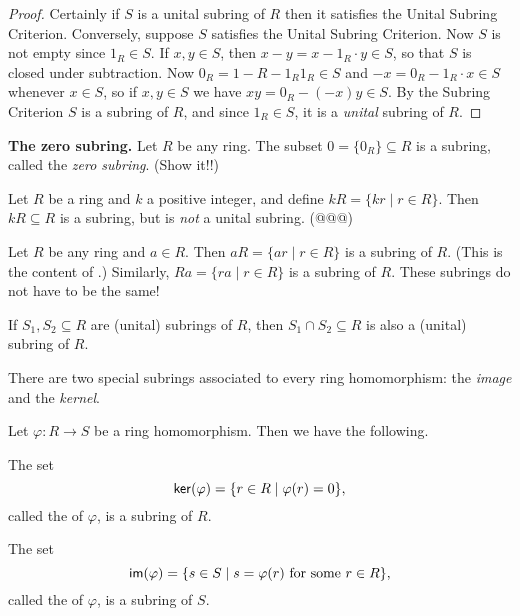 \begin{proof}
Certainly if \(S\) is a unital subring of \(R\) then it satisfies the Unital Subring Criterion. Conversely, suppose \(S\) satisfies the Unital Subring Criterion. Now \(S\) is not empty since \(1_R \in S\). If \(x,y \in S\), then \(x-y = x - 1_R \cdot y \in S\), so that \(S\) is closed under subtraction. Now \(0_R = 1-R - 1_R1_R \in S\) and \(-x = 0_R - 1_R \cdot x \in S\) whenever \(x \in S\), so if \(x,y \in S\) we have \(xy = 0_R - (-x)y \in S\). By the Subring Criterion \(S\) is a subring of \(R\), and since \(1_R \in S\), it is a \emph{unital} subring of \(R\).
\end{proof}

\begin{examples}
\item \textbf{The zero subring.} Let \(R\) be any ring. The subset \(0 = \{0_R\} \subseteq R\) is a subring, called the \emph{zero subring}. (Show it!!)

\item Let \(R\) be a ring and \(k\) a positive integer, and define \(kR = \{ kr \mid r \in R \}\). Then \(kR \subseteq R\) is a subring, but is \emph{not} a unital subring. (@@@)

\item Let \(R\) be any ring and \(a \in R\). Then \(aR = \{ ar \mid r \in R \}\) is a subring of \(R\). (This is the content of .) Similarly, \(Ra = \{ ra \mid r \in R \}\) is a subring of \(R\). These subrings do not have to be the same!

\item If \(S_1, S_2 \subseteq R\) are (unital) subrings of \(R\), then \(S_1 \cap S_2 \subseteq R\) is also a (unital) subring of \(R\).
\end{examples}

There are two special subrings associated to every ring homomorphism: the \emph{image} and the \emph{kernel}.

\begin{prop} \label{dfn:im-ker}
Let \(\varphi : R \rightarrow S\) be a ring homomorphism. Then we have the following.
\begin{proplist}
\item The set \[  \mathsf{ker}(\varphi)  = \{ r \in R \mid \varphi(r) = 0 \}, \] called the  of \(\varphi\), is a subring of \(R\).
\item The set \[  \mathsf{im}(\varphi)  = \{ s \in S \mid s = \varphi(r)\ \mathrm{for\ some}\ r \in R \}, \] called the  of \(\varphi\), is a subring of \(S\).
\end{proplist}
\end{prop}

